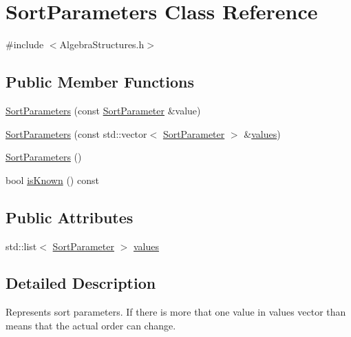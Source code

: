 \hypertarget{class_sort_parameters}{\section{Sort\+Parameters Class Reference}
\label{class_sort_parameters}
}


{\ttfamily \#include $<$Algebra\+Structures.\+h$>$}

\subsection*{Public Member Functions}
\begin{DoxyCompactItemize}
\item 
\hyperlink{class_sort_parameters_a3e09d106c13d4436e73109c8b0cfa60d}{Sort\+Parameters} (const \hyperlink{class_sort_parameter}{Sort\+Parameter} \&value)
\item 
\hyperlink{class_sort_parameters_aa126d980ea7fd9ec7c088f3c642d788c}{Sort\+Parameters} (const std\+::vector$<$ \hyperlink{class_sort_parameter}{Sort\+Parameter} $>$ \&\hyperlink{class_sort_parameters_ad40f9ae2cd97faa92c29f2fc1c3941d0}{values})
\item 
\hyperlink{class_sort_parameters_ab5776bf717741ef321cf59bc712f55eb}{Sort\+Parameters} ()
\item 
bool \hyperlink{class_sort_parameters_aa29d3a50f026c0d840c16af26f8d7b07}{is\+Known} () const 
\end{DoxyCompactItemize}
\subsection*{Public Attributes}
\begin{DoxyCompactItemize}
\item 
std\+::list$<$ \hyperlink{class_sort_parameter}{Sort\+Parameter} $>$ \hyperlink{class_sort_parameters_ad40f9ae2cd97faa92c29f2fc1c3941d0}{values}
\end{DoxyCompactItemize}


\subsection{Detailed Description}
Represents sort parameters. If there is more that one value in values vector than means that the actual order can change. 

